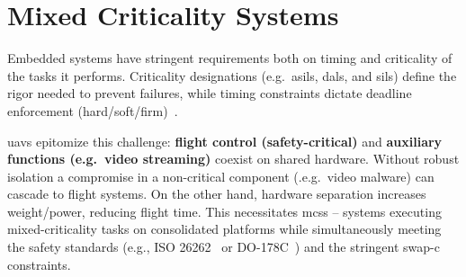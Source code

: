 


\section{Mixed Criticality Systems}%
\label{sec:mixed-crit-syst}
Embedded systems have stringent requirements both on timing and criticality of
the tasks it performs.
Criticality designations (e.g.~\glspl{asil}, \glspl{dal}, and \glspl{sil}) define the rigor needed to prevent failures, while timing constraints dictate deadline enforcement (hard/soft/firm)~\cite{burns2022mixed}. 

\glspl{uav} epitomize this challenge: \textbf{flight control (safety-critical)}
and \textbf{auxiliary functions (e.g.~video streaming)} coexist on shared
hardware. Without robust isolation a compromise in a non-critical component
(.e.g.~video malware) can cascade to flight systems. On the other hand, hardware separation increases weight/power, reducing flight time.
This necessitates \glspl{mcs} -- systems executing mixed-criticality tasks on
consolidated platforms while simultaneously meeting the safety standards (e.g.,
ISO 26262~\cite{iso26262} or DO-178C~\cite{johnson1998sw}) and the stringent \gls{swap-c} constraints.

